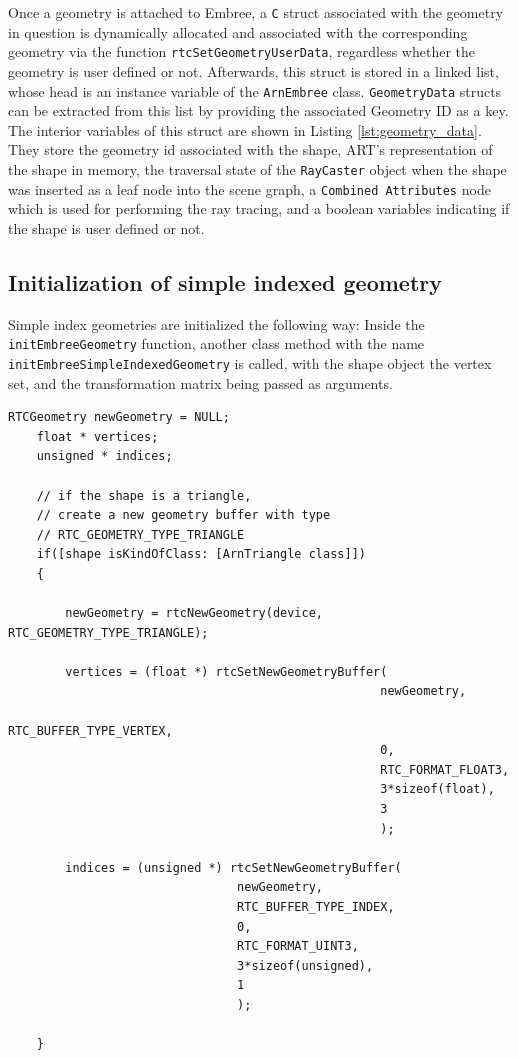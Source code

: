 Once a geometry is attached to Embree, a \texttt{C} struct associated with the geometry in  question is dynamically allocated and associated with the corresponding geometry via the function \texttt{rtcSetGeometryUserData}, regardless whether the geometry is user defined or not. 
Afterwards, this struct is stored in a linked list, whose head is an instance variable of the \texttt{ArnEmbree} class. \texttt{GeometryData} structs can be extracted from this list by providing the associated Geometry ID as a key. The interior variables of this struct are shown in Listing \ref{lst:geometry_data}. They store the geometry id associated with the shape, ART's representation of the shape in memory, the traversal state of the \texttt{RayCaster} object when the shape was inserted as a leaf node into the scene graph, a \texttt{Combined Attributes} node which is used for performing the ray tracing, and a boolean variables indicating if the shape is user defined or not.


\subsection{Initialization of simple indexed geometry}
Simple index geometries are initialized the following way: Inside the \texttt{initEmbreeGeometry} function, another class method with the name \texttt{initEmbreeSimpleIndexedGeometry} is called, with the shape object the vertex set, and the transformation matrix being passed as arguments. 

\begin{listing} 
	\begin{lstlisting}[caption={Setting up geometry buffers for the vertices and indices of a triangle shape.}, label={lst:geometry_buffer}]
	RTCGeometry newGeometry = NULL;
	float * vertices;
	unsigned * indices;
	
	// if the shape is a triangle, 
	// create a new geometry buffer with type
	// RTC_GEOMETRY_TYPE_TRIANGLE
	if([shape isKindOfClass: [ArnTriangle class]]) 
	{
	
		newGeometry = rtcNewGeometry(device, RTC_GEOMETRY_TYPE_TRIANGLE);
		
		vertices = (float *) rtcSetNewGeometryBuffer(
													newGeometry,
													RTC_BUFFER_TYPE_VERTEX,
													0,
													RTC_FORMAT_FLOAT3,
													3*sizeof(float),
													3
													);
		
		indices = (unsigned *) rtcSetNewGeometryBuffer(
		                        newGeometry,
		                        RTC_BUFFER_TYPE_INDEX,
		                        0,
		                        RTC_FORMAT_UINT3,
		                        3*sizeof(unsigned),
		                        1
		                        );
	
	}
	\end{lstlisting}
\end{listing}

